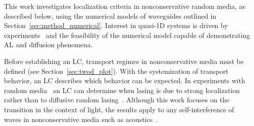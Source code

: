 This work investigates localization criteria in nonconservative random media, as described below, using the numerical models of waveguides outlined in Section~\ref{sec:method_numerical}.
Interest in quasi-1D systems is driven by experiments~\cite{2006_Sheng} and the feasibility of the numerical model capable of demonstrating AL and diffusion phenomena. 

Before establishing an LC, transport regimes in nonconservative media must be defined (see Section~\ref{sec:twod_plot}). With the systemization of transport behavior, an LC describes which behavior can be expected. In experiments with random media~\cite{1999_Cao_RandomLaserPRL,2005_Cao} an LC can determine when lasing is due to strong localization rather than to diffusive random lasing~\cite{2008_Wiersma}. Although this work focuses on the transition in the context of light, the results apply to any self-interference of waves in nonconservative media such as acoustics~\cite{1985_Kirkpatrick,2006_Yamilov_Weaver,2008_van_Tiggelen_Nature}.

